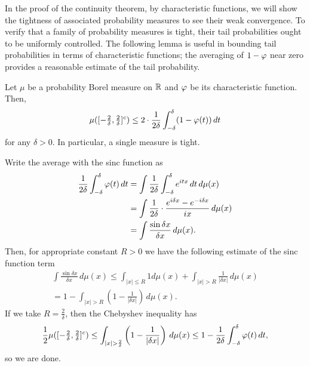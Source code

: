 \documentclass[a4paper]{article}
\begin{document}
In the proof of the continuity theorem, by characteristic functions, we will show the tightness of associated probability measures to see their weak convergence.
To verify that a family of probability measures is tight, their tail probabilities ought to be uniformly controlled.
The following lemma is useful in bounding tail probabilities in terms of characteristic functions; the averaging of $1-\varphi$ near zero provides a reasonable estimate of the tail probability.

\begin{lem}
Let $\mu$ be a probability Borel measure on $\mathbb{R}$ and $\varphi$ be its characteristic function.
Then,
\[\mu([-\tfrac2\delta,\tfrac2\delta]^c)\le2\cdot\frac1{2\delta}\int_{-\delta}^\delta(1-\varphi(t))\,dt\]
for any $\delta>0$.
In particular, a single measure is tight.
\end{lem}
\begin{pf}
Write the average with the sinc function as
\begin{align*}
\frac1{2\delta}\int_{-\delta}^\delta\varphi(t)\,dt
&=\int\frac1{2\delta}\int_{-\delta}^\delta e^{itx}\,dt\,d\mu(x)\\
&=\int\frac1{2\delta}\cdot\frac{e^{i\delta x}-e^{-i\delta x}}{ix}\,d\mu(x)\\
&=\int\frac{\sin\delta x}{\delta x}\,d\mu(x).
\end{align*}
Then, for appropriate constant $R>0$ we have the following estimate of the sinc function term
\begin{align*}
\int\frac{\sin\delta x}{\delta x}\,d\mu(x)
\le\int_{|x|\le R}1d\mu(x)+\int_{|x|>R}\frac1{|\delta x|}\,d\mu(x)\\
=1-\int_{|x|>R}\left(1-\frac1{|\delta x|}\right)\,d\mu(x).
\end{align*}
If we take $R=\frac2\delta$, then the Chebyshev inequality has
\[\frac12\mu([-\tfrac2\delta,\tfrac2\delta]^c)\le\int_{|x|>\frac2\delta}\left(1-\frac1{|\delta x|}\right)\,d\mu(x)\le1-\frac1{2\delta}\int_{-\delta}^\delta\f(t)\,dt,\]
so we are done.
\end{pf}
\end{document}
